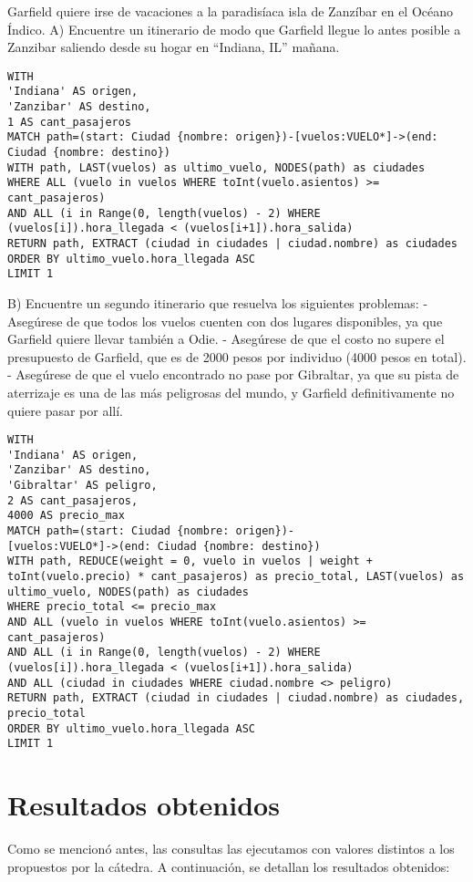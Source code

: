 \documentclass[a4paper,11pt]{article}
\begin{document}
Garfield quiere irse de vacaciones a la paradisíaca isla de Zanzíbar en el Océano Índico.
A) Encuentre un itinerario de modo que Garfield llegue lo antes posible a Zanzibar saliendo desde su hogar en “Indiana, IL” mañana.
\begin{lstlisting}[frame=single]
WITH
'Indiana' AS origen,
'Zanzibar' AS destino,
1 AS cant_pasajeros
MATCH path=(start: Ciudad {nombre: origen})-[vuelos:VUELO*]->(end:
Ciudad {nombre: destino})
WITH path, LAST(vuelos) as ultimo_vuelo, NODES(path) as ciudades
WHERE ALL (vuelo in vuelos WHERE toInt(vuelo.asientos) >=
cant_pasajeros)
AND ALL (i in Range(0, length(vuelos) - 2) WHERE 
(vuelos[i]).hora_llegada < (vuelos[i+1]).hora_salida)
RETURN path, EXTRACT (ciudad in ciudades | ciudad.nombre) as ciudades
ORDER BY ultimo_vuelo.hora_llegada ASC
LIMIT 1
\end{lstlisting}

B) Encuentre un segundo itinerario que resuelva los siguientes problemas:
- Asegúrese de que todos los vuelos cuenten con dos lugares disponibles, ya que Garfield quiere llevar también a Odie.
- Asegúrese de que el costo no supere el presupuesto de Garfield, que es de 2000 pesos por individuo (4000 pesos en total).
- Asegúrese de que el vuelo encontrado no pase por Gibraltar, ya que su pista de aterrizaje es una de las más peligrosas del mundo, y Garfield definitivamente no quiere pasar por allí.
\newpage
\begin{lstlisting}[frame=single]
WITH
'Indiana' AS origen,
'Zanzibar' AS destino,
'Gibraltar' AS peligro,
2 AS cant_pasajeros,
4000 AS precio_max
MATCH path=(start: Ciudad {nombre: origen})-
[vuelos:VUELO*]->(end: Ciudad {nombre: destino})
WITH path, REDUCE(weight = 0, vuelo in vuelos | weight +
toInt(vuelo.precio) * cant_pasajeros) as precio_total, LAST(vuelos) as
ultimo_vuelo, NODES(path) as ciudades
WHERE precio_total <= precio_max
AND ALL (vuelo in vuelos WHERE toInt(vuelo.asientos) >=
cant_pasajeros)
AND ALL (i in Range(0, length(vuelos) - 2) WHERE
(vuelos[i]).hora_llegada < (vuelos[i+1]).hora_salida)
AND ALL (ciudad in ciudades WHERE ciudad.nombre <> peligro)
RETURN path, EXTRACT (ciudad in ciudades | ciudad.nombre) as ciudades,
precio_total
ORDER BY ultimo_vuelo.hora_llegada ASC
LIMIT 1
\end{lstlisting}

\newpage
\section*{Resultados obtenidos}
Como se mencionó antes, las consultas las ejecutamos con valores distintos a los propuestos por la cátedra.
A continuación, se detallan los resultados obtenidos:
\end{document}

